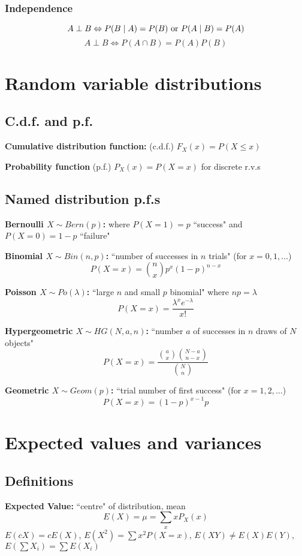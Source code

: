 \documentclass[15pt]{article}
\begin{document}
\subsubsection{Independence}
\[
    A \perp B \Leftrightarrow P(B \; | \; A) = P(B) \textnormal{ or } P(A \; | \; B) = P(A)
\]
\[
    A \perp B \Leftrightarrow P(A \cap B) = P(A) P(B)
\]

\section{Random variable distributions}
\subsection{C.d.f. and p.f.}
\textbf{Cumulative distribution function:} (c.d.f.) $F_X (x) = P(X \leq x)$

\textbf{Probability function} (p.f.) $P_X (x) = P(X = x)$ for discrete r.v.s

\subsection{Named distribution p.f.s}
\textbf{Bernoulli $X \sim Bern(p)$:} where $P(X = 1) = p$ ``success" and $P(X = 0) = 1 - p$ ``failure"

\textbf{Binomial $X \sim Bin(n,p)$:} ``number of successes in $n$ trials" (for $x = 0, 1, \dots$)
\[
    P(X = x) = \binom{n}{x} p^x (1-p)^{n-x}
\]

\textbf{Poisson $X \sim Po(\lambda)$:} ``large $n$ and small $p$ binomial" where $np = \lambda$
\[
    P(X = x) = \frac{\lambda^x e^{-\lambda}}{x!}
\]

\textbf{Hypergeometric $X \sim HG(N,a,n)$:} ``number $a$ of successes in $n$ draws of $N$ objects"
\[
    P(X = x) = \frac{\binom{a}{x} \binom{N-a}{n-x}}{\binom{N}{n}}
\]

\textbf{Geometric $X \sim Geom(p)$:} ``trial number of first success" (for $x = 1, 2, \dots$)
\[
    P(X = x) = (1-p)^{x-1} p
\]

\section{Expected values and variances}
\subsection{Definitions}
\textbf{Expected Value:} ``centre" of distribution, mean
\[
    E(X) = \mu = \sum_{x} x P_X (x)
\]
$E(cX) = cE(X)$, $E(X^2) = \sum x^2 P(X = x)$, $E(XY) \neq E(X)E(Y)$, $E(\sum X_i) = \sum E(X_i)$
\end{document}
